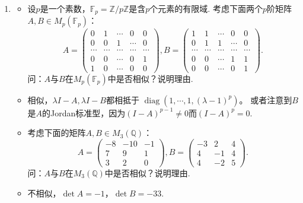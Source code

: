 \begin{enumerate}
    \item[4.3]
    \begin{itemize}
    \item[(i)]
        设$p$是一个素数，$\mathbb{F}_p=\mathbb{Z}/p\mathbb{Z}$是含$p$个元素的有限域.
        考虑下面两个$p$阶矩阵$A,B\in M_p(\mathbb{F}_p)$：
        $$A=\begin{pmatrix}0&1&\cdots&0&0\\
        0&0&1&\cdots&0\\
        \cdots&\cdots&\cdots&\cdots&\cdots\\
        0&0&\cdots&0&1\\
        1&0&\cdots&0&0
    \end{pmatrix},
        B=\begin{pmatrix}1&1&\cdots&0&0\\
        0&1&1&\cdots&0\\
        \cdots&\cdots&\cdots&\cdots&\cdots\\
        0&0&\cdots&1&1\\
        0&0&\cdots&0&1
    \end{pmatrix}.$$
    问：$A$与$B$在$M_p(\mathbb{F}_p)$中是否相似？说明理由.
    \item[\textbf{证明:}]
    相似，$\lambda I-A,\lambda I-B$都相抵于
    $\operatorname{diag}(1,\cdots,1,(\lambda-1)^p)$。
    或者注意到$B$是$A$的Jordan标准型，因为$(I-A)^{p-1}\ne0$而$(I-A)^p=0$.

    \item[(ii)]考虑下面的矩阵$A,B\in M_3(\mathbb{Q})$：
    $$A=\begin{pmatrix}-8&-10&-1\\7&9&1\\3&2&0\end{pmatrix},
    B=\begin{pmatrix}-3&2&4\\4&-1&4\\4&-2&5\end{pmatrix}.$$
    问：$A$与$B$在$M_3(\mathbb{Q})$中是否相似？说明理由.
    \item[\textbf{证明:}] 不相似，$\det A=-1$，$\det B=-33$.
    \end{itemize}


\end{enumerate}
